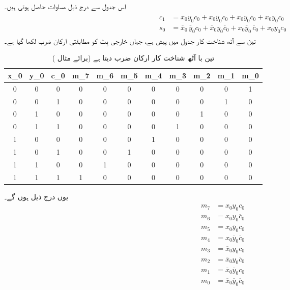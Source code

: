 اس جدول سے درج ذیل مساوات  حاصل ہوتی ہیں۔
\begin{gather}
\begin{aligned}\label{مساوات_ترکیبی_مکمل_ارکان_ضرب}
c_1&=\overline{x}_0y_0c_0+x_0\overline{y}_0c_0+x_0y_0\overline{c}_0+x_0y_0c_0\\
s_0&=\overline{x}_0\,\overline{y}_0c_0+\overline{x}_0y_0\overline{c}_0+
x_0\overline{y}_0\,\overline{c}_0+x_0y_0c_0
\end{aligned}
\end{gather}
تین سے آٹھ شناخت کار  جدول   میں پیش ہے، جہاں خارجی بِٹ کو   مطابقتی ارکان ضرب  لکھا گیا ہے۔
\begin{table}
\caption{تین با آٹھ شناخت کار ارکان ضرب دیتا  ہے (برائے مثال )}
\label{جدول_ترکیبی_شناخت_کار_ارکان_ضرب}
\centering
\begin{otherlanguage}{english}
\begin{tabular}{CCC|CCCCCCCC}
\toprule
x_0&y_0&c_0&m_7&m_6&m_5&m_4&m_3&m_2&m_1&m_0\\
&0&0&0&0&0&0&0&0&0&1\\
0&0&1&0&0&0&0&0&0&1&0\\
0&1&0&0&0&0&0&0&1&0&0\\
0&1&1&0&0&0&0&1&0&0&0\\
1&0&0&0&0&0&1&0&0&0&0\\
1&0&1&0&0&1&0&0&0&0&0\\
1&1&0&0&1&0&0&0&0&0&0\\
1&1&1&1&0&0&0&0&0&0&0\\
\bottomrule
\end{tabular}
\end{otherlanguage}
\end{table}
یوں درج ذیل ہوں گے۔
\begin{gather}
\begin{aligned}\label{مساوات_ترکیبی_شناخت_ارکان_ضرب}
m_7&=x_0y_0c_0\\
m_6&=x_0y_0\overline{c}_0\\
m_5&=x_0\overline{y}_0c_0\\
m_4&=x_0\overline{y}_0\overline{c}_0\\
m_3&=\overline{x}_0y_0c_0\\
m_2&=\overline{x}_0y_0\overline{c}_0\\
m_1&=\overline{x}_0\overline{y}_0c_0\\
m_0&=\overline{x}_0\overline{y}_0\overline{c}_0
\end{aligned}
\end{gather}
